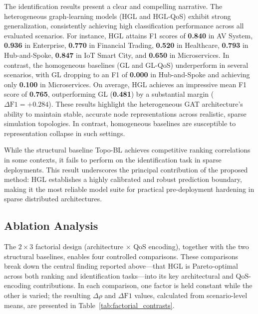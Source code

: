 \documentclass[sigconf,9pt,anonymous]{acmart}
\begin{document}
The identification results present a clear and compelling narrative. The heterogeneous graph-learning models (HGL and HGL-QoS) exhibit strong generalization, consistently achieving high classification performance across all evaluated scenarios. For instance, HGL attains F1 scores of \textbf{0.840} in AV System, \textbf{0.936} in Enterprise, \textbf{0.770} in Financial Trading, \textbf{0.520} in Healthcare, \textbf{0.793} in Hub-and-Spoke, \textbf{0.847} in IoT Smart City, and \textbf{0.650} in Microservices. In contrast, the homogeneous baselines (GL and GL-QoS) underperform in several scenarios, with GL dropping to an F1 of \textbf{0.000} in Hub-and-Spoke and achieving only \textbf{0.100} in Microservices. On average, HGL achieves an impressive mean F1 score of \textbf{0.765}, outperforming GL (\textbf{0.481}) by a substantial margin ($\Delta\text{F1} = +0.284$). These results highlight the heterogeneous GAT architecture's ability to maintain stable, accurate node representations across realistic, sparse simulation topologies. In contrast, homogeneous baselines are susceptible to representation collapse in such settings.

While the structural baseline Topo-BL achieves competitive ranking correlations in some contexts, it fails to perform on the identification task in sparse deployments. This result underscores the principal contribution of the proposed method: HGL establishes a highly calibrated and robust prediction boundary, making it the most reliable model suite for practical pre-deployment hardening in sparse distributed architectures.

\subsection{Ablation Analysis}

The $2\times3$ factorial design (architecture $\times$ QoS encoding), together with the two structural baselines, enables four controlled comparisons. These comparisons break down the central finding reported above—that HGL is Pareto-optimal across both ranking and identification tasks—into its key architectural and QoS-encoding contributions. In each comparison, one factor is held constant while the other is varied; the resulting $\Delta\rho$ and $\Delta\text{F1}$ values, calculated from scenario-level means, are presented in Table~\ref{tab:factorial_contrasts}.
\end{document}
